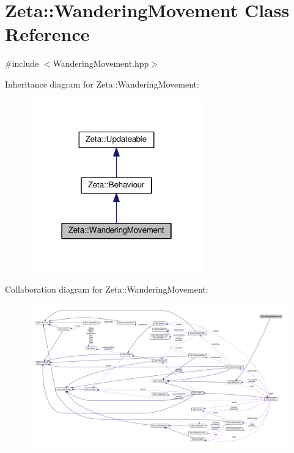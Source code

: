 \hypertarget{classZeta_1_1WanderingMovement}{\section{Zeta\+:\+:Wandering\+Movement Class Reference}
\label{classZeta_1_1WanderingMovement}
}


{\ttfamily \#include $<$Wandering\+Movement.\+hpp$>$}



Inheritance diagram for Zeta\+:\+:Wandering\+Movement\+:\nopagebreak
\begin{figure}[H]
\begin{center}
\leavevmode
\includegraphics[width=214pt]{classZeta_1_1WanderingMovement__inherit__graph}
\end{center}
\end{figure}


Collaboration diagram for Zeta\+:\+:Wandering\+Movement\+:
\nopagebreak
\begin{figure}[H]
\begin{center}
\leavevmode
\includegraphics[width=350pt]{classZeta_1_1WanderingMovement__coll__graph}
\end{center}
\end{figure}

